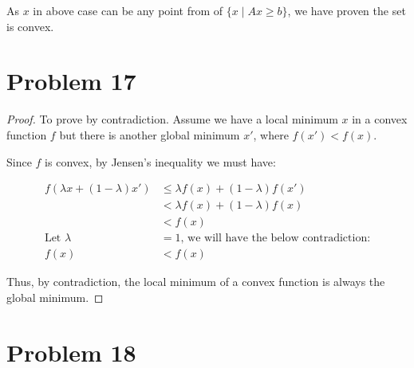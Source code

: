 \documentclass[12pt]{article}
\begin{document}
As $x$ in above case can be any point from of $\{x \mid Ax \geq b \}$, we have proven the set is convex.

\section{Problem 17}

\begin{proof}
To prove by contradiction. Assume we have a local minimum $x$ in a convex function $f$ but there is another global minimum $x'$, where $f(x') < f(x)$.

Since $f$ is convex, by Jensen's inequality we must have:

\begin{align*}
    f(\lambda x + (1 - \lambda)x') &\leq \lambda f(x) + (1 - \lambda)f(x') \\
    &< \lambda f(x) + (1 - \lambda)f(x) \\
    &< f(x) \\
    \text{Let \ } \lambda &= 1 \text{, we will have the below contradiction:} \\
    f(x) &< f(x)
\end{align*}

Thus, by contradiction, the local minimum of a convex function is always the global minimum.

\end{proof}

\section{Problem 18}


% 
% 
\end{document}
